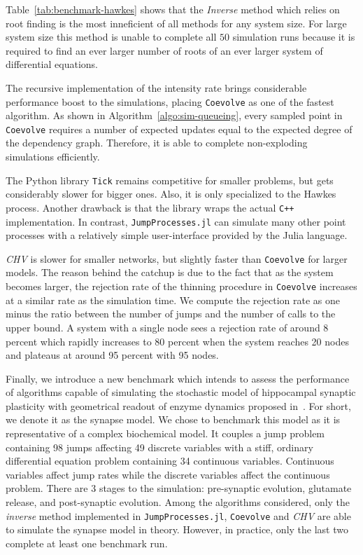 \documentclass{juliacon}
\begin{document}
Table~\ref{tab:benchmark-hawkes} shows that the \textit{Inverse} method which relies on root finding is the most inneficient of all methods for any system size. For large system size this method is unable to complete all \( 50 \) simulation runs because it is required to find an ever larger number of roots of an ever larger system of differential equations.

The recursive implementation of the intensity rate brings considerable performance boost to the simulations, placing \texttt{Coevolve} as one of the fastest algorithm. As shown in Algorithm~\ref{algo:sim-queueing}, every sampled point in \texttt{Coevolve} requires a number of expected updates equal to the expected degree of the dependency graph. Therefore, it is able to complete non-exploding simulations efficiently.

The Python library \texttt{Tick} remains competitive for smaller problems, but gets considerably slower for bigger ones. Also, it is only specialized to the Hawkes process. Another drawback is that the library wraps the actual \texttt{C++} implementation. In contrast, \texttt{JumpProcesses.jl} can simulate many other point processes with a relatively simple user-interface provided by the Julia language. 

\textit{CHV} is slower for smaller networks, but slightly faster than \texttt{Coevolve} for larger models. The reason behind the catchup is due to the fact that as the system becomes larger, the rejection rate of the thinning procedure in \texttt{Coevolve} increases at a similar rate as the simulation time. We compute the rejection rate as one minus the ratio between the number of jumps and the number of calls to the upper bound. A system with a single node sees a rejection rate of around 8 percent which rapidly increases to 80 percent when the system reaches 20 nodes and plateaus at around 95 percent with 95 nodes.

Finally, we introduce a new benchmark which intends to assess the performance of algorithms capable of simulating the stochastic model of hippocampal synaptic plasticity with geometrical readout of enzyme dynamics proposed in~\cite{rodrigues2021}. For short, we denote it as the synapse model. We chose to benchmark this model as it is representative of a complex biochemical model. It couples a jump problem containing 98 jumps affecting 49 discrete variables with a stiff, ordinary differential equation problem containing 34 continuous variables. Continuous variables affect jump rates while the discrete variables affect the continuous problem. There are 3 stages to the simulation: pre-synaptic evolution, glutamate release, and post-synaptic evolution. Among the algorithms considered, only the \textit{inverse} method implemented in \texttt{JumpProcesses.jl}, \texttt{Coevolve} and \textit{CHV} are able to simulate the synapse model in theory. However, in practice, only the last two complete at least one benchmark run.
\end{document}
